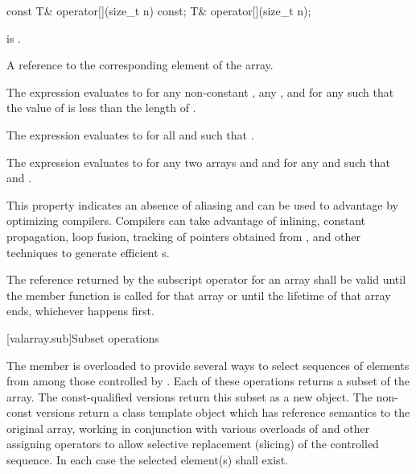 %
\begin{itemdecl}
const T&  operator[](size_t n) const;
T& operator[](size_t n);
\end{itemdecl}

\begin{itemdescr}
\pnum
\expects
{} is .

\pnum
\returns
A reference to the corresponding element of the array.
\begin{note}
The expression 
evaluates to  for any non-constant ,
any , and for any 
such that the value of  is less than the length of .
\end{note}

\pnum
\remarks
The expression 
evaluates to  for all  and 
such that .

\pnum
The expression 
evaluates to  for any two arrays
 and  and for any
 and 
such that 
and .
\begin{note}
This property indicates an absence of aliasing and can be used to
advantage by optimizing compilers. Compilers can take advantage
of inlining, constant propagation, loop fusion,
tracking of pointers obtained from
,
and other techniques to generate efficient
s.
\end{note}

\pnum
The reference returned by the subscript operator for an array shall
be valid until the member function
 is called for that array or until the lifetime of
that array ends, whichever happens first.
\end{itemdescr}

[valarray.sub]{Subset operations}

%
\pnum
The member  is overloaded to provide several ways to select
sequences of elements from among those controlled by . Each of these
operations returns a subset of the array. The const-qualified versions return this
subset as a new  object. The non-const versions return a class
template object which has reference semantics to the original array, working in
conjunction with various overloads of  and other assigning
operators to allow selective replacement (slicing) of the controlled sequence.
In each case the selected element(s) shall exist.


